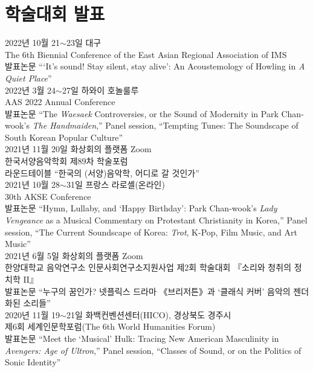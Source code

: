 \documentclass[a4paper,10pt,draft]{article}
\begin{document}
  \section*{\normalsize 학술대회 발표}
  
  \noindent 2022년 10월 21$\sim$23일 대구\\    
  The 6th Biennial Conference of the East Asian Regional Association of IMS\\
  발표논문 “‘It’s sound! Stay silent, stay alive’: An Acoustemology of Howling in \textit{A Quiet Place}”\\
  
  \noindent 2022년 3월 24$\sim$27일 하와이 호놀룰루\\
  AAS 2022 Annual Conference\\
  발표논문 “The \textit{Waesaek} Controversies, or the Sound of Modernity in Park Chan-wook’s \textit{The Handmaiden},” Panel session, “Tempting Tunes: The Soundscape of South Korean Popular Culture”\\
  
  \noindent 2021년 11월 20일 화상회의 플랫폼 Zoom\\
  한국서양음악학회 제89차 학술포럼\\
  라운드테이블 ``한국의 (서양)음악학, 어디로 갈 것인가''\\
  
  \noindent 2021년 10월 28$\sim$31일 프랑스 라로셸(온라인)\\
  30th AKSE Conference\\
  발표논문 “Hymn, Lullaby, and ‘Happy Birthday’: Park Chan-wook’s \textit{Lady Vengeance} as a Musical Commentary on Protestant Christianity in Korea,” Panel session, “The Current Soundscape of Korea: \textit{Trot}, K-Pop, Film Music, and Art Music”\\
  
  \noindent 2021년 6월 5일 화상회의 플랫폼 Zoom\\
  한양대학교 음악연구소 인문사회연구소지원사업 제2회 학술대회 『소리와 청취의 정치학 II』\\
  발표논문 “누구의 꿈인가? 넷플릭스 드라마 《브리저튼》과 ‘클래식 커버’ 음악의 젠더화된 소리들”\\
  
  \noindent 2020년 11월 19$\sim$21일 화백컨벤션센터(HICO), 경상북도 경주시\\
  제6회 세계인문학포럼(The 6th World Humanities Forum)\\
  발표논문 “Meet the ‘Musical’ Hulk: Tracing New American Masculinity in \textit{Avengers: Age of Ultron},” Panel session, “Classes of Sound, or on the Politics of Sonic Identity”\\
  
\end{document}
